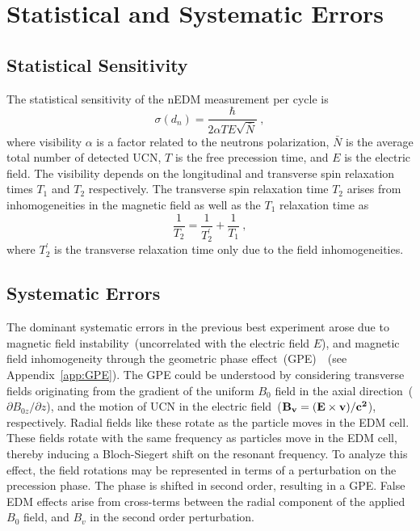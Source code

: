 \section{Statistical and Systematic Errors}
\subsection{Statistical Sensitivity}
The statistical sensitivity of the nEDM measurement per cycle is
\begin{equation}
  \label{eqn:dnsensitivity}
\sigma(d_n) = \frac{\hbar}{2 \alpha T E \sqrt{\bar{N}}}~,
\end{equation}
where visibility $\alpha$ is a factor related to the neutrons
polarization, $\bar{N}$ is the average total number of detected UCN,
$T$ is the free precession time, and $E$ is the electric field. The
visibility depends on the longitudinal and transverse spin relaxation
times $T_1$ and $T_2$ respectively. The transverse spin relaxation
time $T_2$ arises from inhomogeneities in the magnetic field as well
as the $T_1$ relaxation time as
\begin{equation}
\frac{1}{T_2} = \frac{1}{T_2^{\prime}}+\frac{1}{T_1}~,
\end{equation}
where $T_2^{\prime}$ is the transverse relaxation time only due to the
field inhomogeneities.

\subsection{Systematic Errors}
The dominant systematic errors in the previous best experiment arose
due to magnetic field instability~(uncorrelated with the electric
field $E$), and magnetic field inhomogeneity through the geometric phase
effect~(GPE)~\cite{pendlebury2004}~(see Appendix~\ref{app:GPE}).
The GPE could be understood by considering transverse fields
originating from the gradient of the uniform $B_0$ field in the axial
direction~($\partial{B_{0z}}/\partial{z}$), and the motion of UCN in
the electric field~($\bf{B_v} =(\bf{E} \times \bf{v})/c^2 $),
respectively. Radial fields like these rotate as the particle moves in
the EDM cell.  These fields rotate with the same frequency as
particles move in the EDM cell, thereby inducing a Bloch-Siegert shift
on the resonant frequency. To analyze this effect, the field rotations
may be represented in terms of a perturbation on the precession
phase. The phase is shifted in second order, resulting in a GPE. False
EDM effects arise from cross-terms between the radial component of the
applied $B_0$ field, and $B_v$ in the second order perturbation.

